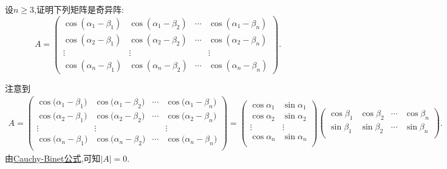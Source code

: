 \documentclass[../../main.tex]{subfiles}%
\begin{document}
\begin{example}
设\(n\geqslant 3\),证明下列矩阵是奇异阵:
\[
A = 
\begin{pmatrix}
\cos(\alpha_1 - \beta_1) & \cos(\alpha_1 - \beta_2) & \cdots & \cos(\alpha_1 - \beta_n)\\
\cos(\alpha_2 - \beta_1) & \cos(\alpha_2 - \beta_2) & \cdots & \cos(\alpha_2 - \beta_n)\\
\vdots & \vdots & & \vdots\\
\cos(\alpha_n - \beta_1) & \cos(\alpha_n - \beta_2) & \cdots & \cos(\alpha_n - \beta_n)
\end{pmatrix}.
\]    
\end{example}
\begin{solution}
注意到
\begin{align*}
A=\left( \begin{matrix}
\cos\mathrm{(}\alpha _1-\beta _1)&		\cos\mathrm{(}\alpha _1-\beta _2)&		\cdots&		\cos\mathrm{(}\alpha _1-\beta _n)\\
\cos\mathrm{(}\alpha _2-\beta_1)&		\cos\mathrm{(}\alpha_2-\beta _2)&		\cdots&	\cos\mathrm{(}\alpha _2-\beta _n)\\
\vdots&		\vdots&		&	\vdots\\
\cos\mathrm{(}\alpha _n-\beta_1)&		\cos\mathrm{(}\alpha_n-\beta _2)&		\cdots&	\cos\mathrm{(}\alpha _n-\beta _n)\\
\end{matrix} \right) 
=\left( \begin{matrix}
\cos \alpha _1&		\sin \alpha_1\\
\cos \alpha _2&		\sin \alpha_2\\
\vdots&		\vdots\\
\cos \alpha _n&		\sin \alpha_n\\
\end{matrix} \right) \left( \begin{matrix}
\cos \beta _1&		\cos \beta _2&		\cdots&		\cos \beta _n\\
\sin \beta _1&		\sin \beta _2&		\cdots&		\sin \beta _n\\
\end{matrix} \right) .
\end{align*}
由\hyperref[theorem:Cauchy-Binet公式]{Cauchy-Binet公式},可知$\left| A \right|=0$.

\end{solution}
\end{document}

